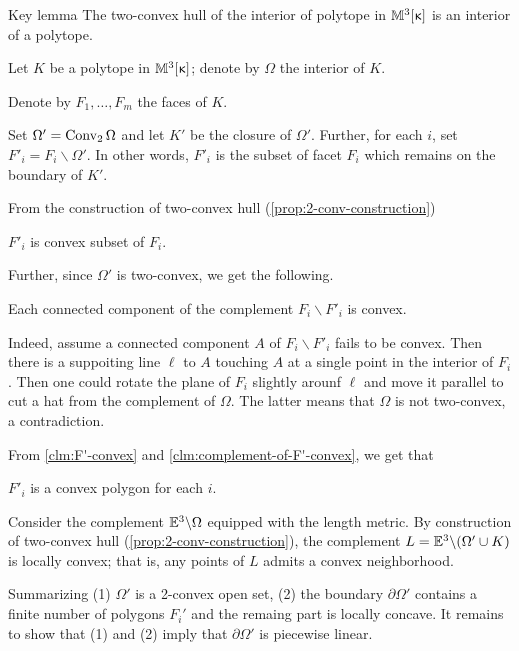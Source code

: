 \begin{thm}{Key lemma}\label{lem:key-shefel}
The two-convex hull of the interior of polytope in $\mathbb{M}_{{}}^{3}[{\upkappa}]$
is an interior of a polytope.
\end{thm}

Let $K$ be a polytope in $\mathbb{M}_{{}}^{3}[{\upkappa}]$;
denote by $\Omega$ the interior of $K$.

Denote by $F_1,\dots,F_m$ the faces of $K$.

Set $\Omega'=\mathop{\rm Conv}\nolimits_2\Omega$ and let $K'$ be the closure of $\Omega'$.
Further, 
for each $i$, 
set $F'_i=F_i\backslash \Omega'$.
In other words, 
$F'_i$ is the subset of facet $F_i$ 
which remains on the boundary of $K'$.

From the construction of two-convex hull (\ref{prop:2-conv-construction})

\begin{clm}{}\label{clm:F'-convex}
$F'_i$ is convex subset of $F_i$.
\end{clm}

Further, since $\Omega'$ is two-convex,
we get the following.

\begin{clm}{}\label{clm:complement-of-F'-convex}
Each connected component of the complement $F_i\backslash F'_i$ is convex.
\end{clm}

Indeed, assume a connected component $A$ of $F_i\backslash F'_i$ fails to be convex.
Then there is a suppoiting line $\ell$ to $A$ touching $A$ at a single point in the interior of $F_i$.
Then one could rotate the plane of $F_i$ slightly arounf $\ell$ and move it parallel to cut a hat from the complement of $\Omega$.
The latter means that $\Omega$ is not two-convex, 
a contradiction.
\claimqeds

From \ref{clm:F'-convex} and \ref{clm:complement-of-F'-convex}, we get that 

\begin{clm}{}$F'_i$ is a convex polygon for each $i$.
\end{clm}

Consider the complement 
$\mathbb{E}^3\backslash \Omega$ 
equipped with the length metric.
By construction of two-convex hull (\ref{prop:2-conv-construction}), 
the complement $L=\EE^3\backslash (\Omega'\cup K)$
is locally convex;
that is, any points of $L$ admits a convex neighborhood.

Summarizing (1)
$\Omega'$ is a 2-convex open set,
(2) the boundary $\partial\Omega'$ 
contains a finite number of polygons $F_i'$
and the remaing part is locally concave.
It remains to show that (1) and (2) imply that $\partial\Omega'$
is piecewise linear.

